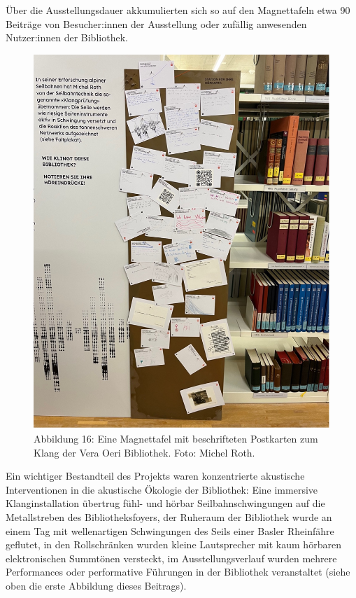 \documentclass[a4paper,
fontsize=11pt,
oneside,
numbers=noperiodatend,
parskip=half-,
bibliography=totoc,
final
]{scrartcl}
\begin{document}
Über die Ausstellungsdauer akkumulierten sich so auf den Magnettafeln
etwa 90 Beiträge von Besucher:innen der Ausstellung oder zufällig
anwesenden Nutzer:innen der Bibliothek.

\begin{figure}
\centering
\includegraphics{img/Abb16.jpg}
\caption{Abbildung 16: Eine Magnettafel mit beschrifteten Postkarten zum
Klang der Vera Oeri Bibliothek. Foto: Michel Roth.}
\end{figure}

Ein wichtiger Bestandteil des Projekts waren konzentrierte akustische
Interventionen in die akustische Ökologie der Bibliothek: Eine immersive
Klanginstallation übertrug fühl- und hörbar Seilbahnschwingungen auf die
Metallstreben des Bibliotheksfoyers, der Ruheraum der Bibliothek wurde
an einem Tag mit wellenartigen Schwingungen des Seils einer Basler
Rheinfähre geflutet, in den Rollschränken wurden kleine Lautsprecher mit
kaum hörbaren elektronischen Summtönen versteckt, im Ausstellungsverlauf
wurden mehrere Performances oder performative Führungen in der
Bibliothek veranstaltet (siehe oben die erste Abbildung dieses
Beitrags).
\end{document}
